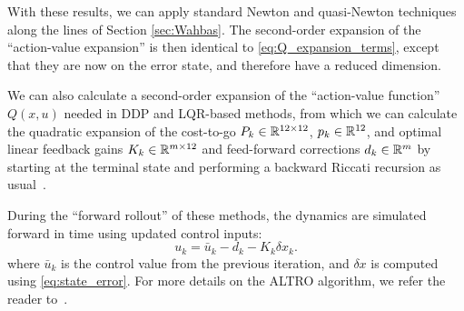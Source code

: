 \documentclass[../root.tex]{subfiles}
\begin{document}
	
	With these results, we can apply standard Newton and quasi-Newton
	techniques along the lines of Section \ref{sec:Wahbas}. 
    The second-order expansion of the ``action-value expansion'' is then 
    identical to \ref{eq:Q_expansion_terms}, except that they are now
    on the error state, and therefore have a reduced dimension. 
    
    We can also
	calculate a second-order expansion of the ``action-value function''
	$Q(x,u)$ needed in DDP and LQR-based methods,
    from which we can calculate the quadratic expansion of the cost-to-go 
    $P_k \in \mathbb{R}^{12 \times 12}$, $p_k \in \mathbb{R}^{12}$, and optimal linear feedback gains 
    $K_k \in \mathbb{R}^{m \times 12}$ and feed-forward corrections $d_k \in \mathbb{R}^m$ by starting at the terminal state and
    performing a backward Riccati recursion as usual~\cite{li_Iterative_2004,howell_ALTRO_2019}.
    
    During the ``forward rollout'' of these methods, the dynamics are simulated forward in time using updated control inputs: 
    \begin{equation} \label{eq:mlqr_control}
        u_k = \bar{u}_k - d_k - K_k \delta x_k.
    \end{equation}
    where $\bar{u}_k$ is the control value from the previous iteration, and $\delta x$ is
    computed using \eqref{eq:state_error}. %
    For more details on the ALTRO algorithm, we refer the reader to~\cite{howell_ALTRO_2019}.
\end{document}
